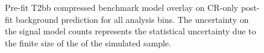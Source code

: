 \begin{figure}[h!]
\begin{center}
{            \label{fig:T2bb_compressed_MR_4j}
        } \\
         ~~
         \\
        \caption{
            Pre-fit T2bb compressed benchmark model overlay on CR-only
            post-fit background prediction for all analysis bins. The
            uncertainty on the signal model counts represents the statistical
            uncertainty due to the finite size of the of the simulated sample.
        }
        \label{fig:T2bb_compressed_MR}
    \end{center}
\end{figure}

